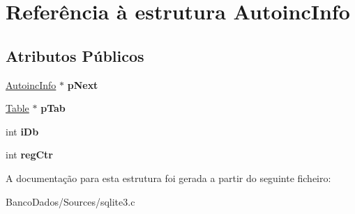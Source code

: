 \hypertarget{struct_autoinc_info}{\section{Referência à estrutura Autoinc\-Info}
\label{struct_autoinc_info}
}
\subsection*{Atributos Públicos}
\begin{DoxyCompactItemize}
\item 
\hypertarget{struct_autoinc_info_aa77fb076beea013c25df4e49dba4b6f6}{\hyperlink{struct_autoinc_info}{Autoinc\-Info} $\ast$ {\bfseries p\-Next}}\label{struct_autoinc_info_aa77fb076beea013c25df4e49dba4b6f6}

\item 
\hypertarget{struct_autoinc_info_a0cf785b0cbaddb4215a8408f8e13075e}{\hyperlink{struct_table}{Table} $\ast$ {\bfseries p\-Tab}}\label{struct_autoinc_info_a0cf785b0cbaddb4215a8408f8e13075e}

\item 
\hypertarget{struct_autoinc_info_ae7234e0916b11ef97377bdfd6c7c4568}{int {\bfseries i\-Db}}\label{struct_autoinc_info_ae7234e0916b11ef97377bdfd6c7c4568}

\item 
\hypertarget{struct_autoinc_info_af180977ee7dcc8cab862185692f57cc5}{int {\bfseries reg\-Ctr}}\label{struct_autoinc_info_af180977ee7dcc8cab862185692f57cc5}

\end{DoxyCompactItemize}


A documentação para esta estrutura foi gerada a partir do seguinte ficheiro\-:\begin{DoxyCompactItemize}
\item 
Banco\-Dados/\-Sources/sqlite3.\-c\end{DoxyCompactItemize}
